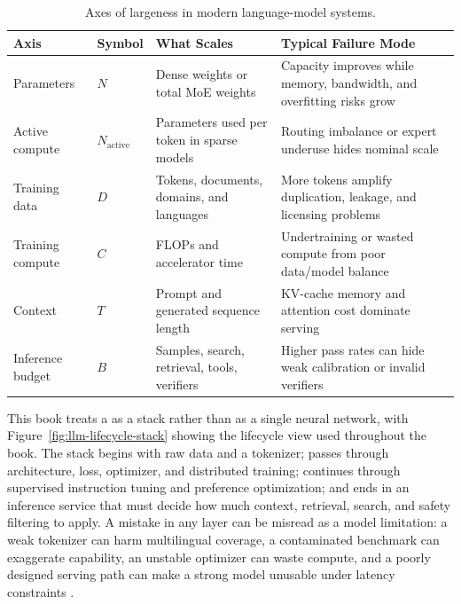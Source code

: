 \begin{table}[t]
\caption{Axes of largeness in modern language-model systems.}
\label{tab:axes-of-largeness}
\small
\begin{tabular}{@{}p{2.35cm}p{1.45cm}p{3.55cm}p{4.25cm}@{}}
\toprule
Axis & Symbol & What Scales & Typical Failure Mode \\
\midrule
Parameters & $N$ & Dense weights or total MoE weights & Capacity improves while memory, bandwidth, and overfitting risks grow \\
Active compute & $N_{\mathrm{active}}$ & Parameters used per token in sparse models & Routing imbalance or expert underuse hides nominal scale \\
Training data & $D$ & Tokens, documents, domains, and languages & More tokens amplify duplication, leakage, and licensing problems \\
Training compute & $C$ & FLOPs and accelerator time & Undertraining or wasted compute from poor data/model balance \\
Context & $T$ & Prompt and generated sequence length & KV-cache memory and attention cost dominate serving \\
Inference budget & $B$ & Samples, search, retrieval, tools, verifiers & Higher pass rates can hide weak calibration or invalid verifiers \\
\bottomrule
\end{tabular}
\end{table}

This book treats a \llm as a stack rather than as a single neural network, with Figure~\ref{fig:llm-lifecycle-stack} showing the lifecycle view used throughout the book. The stack begins with raw data and a tokenizer; passes through architecture, loss, optimizer, and distributed training; continues through supervised instruction tuning and preference optimization; and ends in an inference service that must decide how much context, retrieval, search, and safety filtering to apply. A mistake in any layer can be misread as a model limitation: a weak tokenizer can harm multilingual coverage, a contaminated benchmark can exaggerate capability, an unstable optimizer can waste compute, and a poorly designed serving path can make a strong model unusable under latency constraints \cite{shi2023detecting,xu2024benchmark}.

